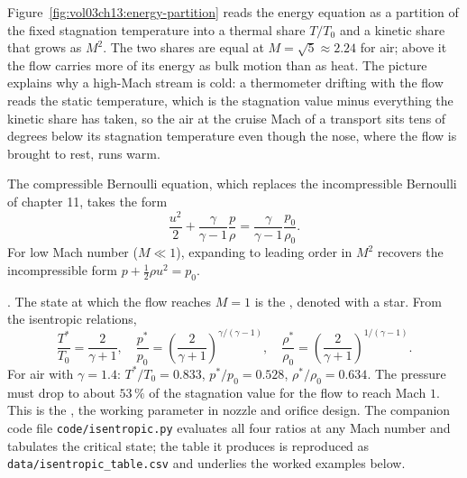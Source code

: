 

Figure~\ref{fig:vol03ch13:energy-partition} reads the energy equation
as a partition of the fixed stagnation temperature into a thermal
share $T/T_0$ and a kinetic share that grows as $M^2$. The two shares
are equal at $M = \sqrt{5} \approx 2.24$ for air; above it the flow
carries more of its energy as bulk motion than as heat. The picture
explains why a high-Mach stream is cold: a thermometer drifting with
the flow reads the static temperature, which is the stagnation value
minus everything the kinetic share has taken, so the air at the cruise
Mach of a transport sits tens of degrees below its stagnation
temperature even though the nose, where the flow is brought to rest,
runs warm.

The compressible Bernoulli equation, which replaces the
incompressible Bernoulli of chapter 11, takes the form
\[
\frac{u^2}{2} + \frac{\gamma}{\gamma - 1}\frac{p}{\rho} =
\frac{\gamma}{\gamma - 1}\frac{p_0}{\rho_0}.
\]
For low Mach number ($M \ll 1$), expanding to leading order in
$M^2$ recovers the incompressible form $p + \tfrac{1}{2}\rho u^2
= p_0$.

. The state at which the flow
reaches $M = 1$ is the , denoted with a
star. From the isentropic relations,
\[
\frac{T^*}{T_0} = \frac{2}{\gamma + 1}, \quad
\frac{p^*}{p_0} = \left(\frac{2}{\gamma + 1}\right)^{\gamma/(\gamma
- 1)}, \quad
\frac{\rho^*}{\rho_0} = \left(\frac{2}{\gamma + 1}\right)^{1/(\gamma
- 1)}.
\]
For air with $\gamma = 1.4$: $T^*/T_0 = 0.833$, $p^*/p_0 = 0.528$,
$\rho^*/\rho_0 = 0.634$. The pressure must drop to about $53\,\%$
of the stagnation value for the flow to reach Mach $1$. This is
the , the working parameter in
nozzle and orifice design. The companion code file
\texttt{code/isentropic.py} evaluates all four ratios at any Mach
number and tabulates the critical state; the table it produces is
reproduced as \texttt{data/isentropic\_table.csv} and underlies the
worked examples below.

